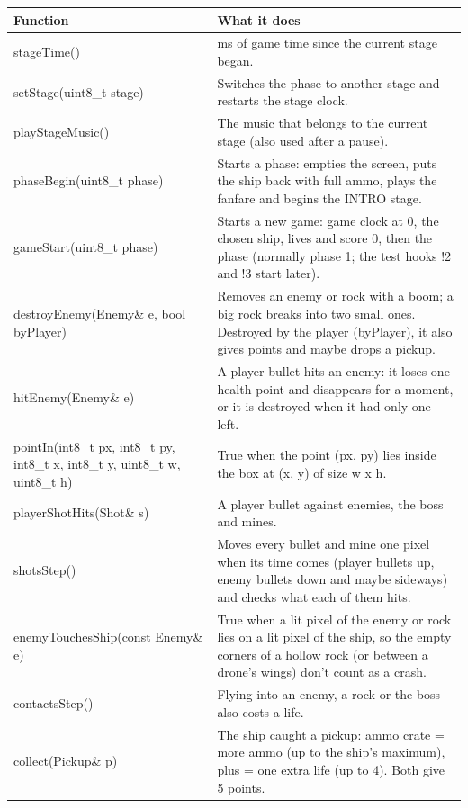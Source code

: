 \documentclass[11pt,a4paper]{article}
\begin{document}
{\footnotesize\begin{longtable}{|>{\raggedright\arraybackslash}p{5.82cm}|>{\raggedright\arraybackslash}p{10.68cm}|}
\hline\rowcolor{accent}\textbf{\color{white}Function} & \textbf{\color{white}What it does}\\\hline\endhead
stageTime() & ms of game time since the current stage began.\\\hline
\rowcolor{rowshade}setStage(uint8\_t stage) & Switches the phase to another stage and restarts the stage clock.\\\hline
playStageMusic() & The music that belongs to the current stage (also used after a pause).\\\hline
\rowcolor{rowshade}phaseBegin(uint8\_t phase) & Starts a phase: empties the screen, puts the ship back with full ammo, plays the fanfare and begins the INTRO stage.\\\hline
gameStart(uint8\_t phase) & Starts a new game: game clock at 0, the chosen ship, lives and score 0, then the phase (normally phase 1; the test hooks !2 and !3 start later).\\\hline
\rowcolor{rowshade}destroyEnemy(Enemy\& e, bool byPlayer) & Removes an enemy or rock with a boom; a big rock breaks into two small ones. Destroyed by the player (byPlayer), it also gives points and maybe drops a pickup.\\\hline
hitEnemy(Enemy\& e) & A player bullet hits an enemy: it loses one health point and disappears for a moment, or it is destroyed when it had only one left.\\\hline
\rowcolor{rowshade}pointIn(int8\_t px, int8\_t py, int8\_t x, int8\_t y, uint8\_t w, uint8\_t h) & True when the point (px, py) lies inside the box at (x, y) of size w x h.\\\hline
playerShotHits(Shot\& s) & A player bullet against enemies, the boss and mines.\\\hline
\rowcolor{rowshade}shotsStep() & Moves every bullet and mine one pixel when its time comes (player bullets up, enemy bullets down and maybe sideways) and checks what each of them hits.\\\hline
enemyTouchesShip(const Enemy\& e) & True when a lit pixel of the enemy or rock lies on a lit pixel of the ship, so the empty corners of a hollow rock (or between a drone's wings) don't count as a crash.\\\hline
\rowcolor{rowshade}contactsStep() & Flying into an enemy, a rock or the boss also costs a life.\\\hline
collect(Pickup\& p) & The ship caught a pickup: ammo crate = more ammo (up to the ship's maximum), plus = one extra life (up to 4). Both give 5 points.\\\hline

\end{longtable}}
\end{document}
